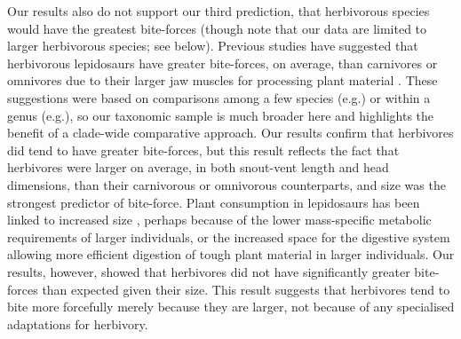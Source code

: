 \documentclass[a4paper, 12pt]{article}
\begin{document}
Our results also do not support our third prediction, that herbivorous species would have the greatest bite-forces (though note that our data are limited to larger herbivorous species; see below).
Previous studies have suggested that herbivorous lepidosaurs have greater bite-forces, on average, than carnivores or omnivores due to their larger jaw muscles for processing plant material \cite{metzger2005correlations,cooper2002distribution,herrel1999morphology,herrel1999sexual,herrel2004omnivory,Herrel2008,herrel2014does}.
These suggestions were based on comparisons among a few species (e.g.\cite{herrel2014does,herrel2004omnivory}) or within a genus (e.g.\cite{lopez2015sex}), so our taxonomic sample is much broader here and highlights the benefit of a clade-wide comparative approach. 
Our results confirm that herbivores did tend to have greater bite-forces, but this result reflects the fact that herbivores were larger on average, in both snout-vent length and head dimensions, than their carnivorous or omnivorous counterparts, and size was the strongest predictor of bite-force. 
Plant consumption in lepidosaurs has been linked to increased size \cite{cooper2002distribution,herrel2014does,metzger2005correlations}, perhaps because of the lower mass-specific metabolic requirements of larger individuals, or the increased space for the digestive system allowing more efficient digestion of tough plant material in larger individuals\cite{herrel2014does,espinoza2004recurrent}.
Our results, however, showed that herbivores did not have significantly greater bite-forces than expected given their size. This result suggests that herbivores tend to bite more forcefully merely because they are larger, not because of any specialised adaptations for herbivory. 
\end{document}
